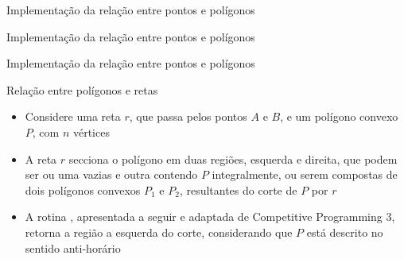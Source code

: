 \begin{frame}[fragile]{Implementação da relação entre pontos e polígonos}
\end{frame}

\begin{frame}[fragile]{Implementação da relação entre pontos e polígonos}
\end{frame}

\begin{frame}[fragile]{Implementação da relação entre pontos e polígonos}
\end{frame}

\begin{frame}[fragile]{Relação entre polígonos e retas}

    \begin{itemize}
        \item Considere uma reta $r$, que passa pelos pontos $A$ e $B$, e um polígono convexo $P$, 
            com $n$ vértices

        \item A reta $r$ secciona o polígono em duas regiões, esquerda e direita, que podem ser ou 
            uma vazias e outra contendo $P$ integralmente, ou serem compostas de dois polígonos 
            convexos $P_1$ e $P_2$, resultantes do corte de $P$ por $r$

        \item A rotina , apresentada a seguir e adaptada de Competitive 
            Programming 3, retorna a região a esquerda do corte, considerando que $P$ está descrito 
            no sentido anti-horário
    \end{itemize}

    \begin{figure}
        \centering

    \end{figure}

\end{frame}


